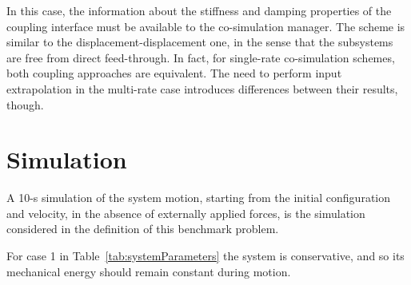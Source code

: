 \documentclass[fleqn,11pt]{article}
\begin{document}
In this case, the information about the stiffness and damping properties of the coupling interface must be available to the co-simulation manager.
The scheme is similar to the displacement-displacement one, in the sense that the subsystems are free from direct feed-through. 
In fact, for single-rate co-simulation schemes, both coupling approaches are equivalent.
The need to perform input extrapolation in the multi-rate case introduces differences between their results, though.


\section{Simulation}
\label{Simulation}

A 10-s simulation of the system motion, starting from the initial configuration and velocity, in the absence of externally applied forces, is the simulation considered in the definition of this benchmark problem.

For case 1 in Table~\ref{tab:systemParameters} the system is conservative, and so its mechanical energy should remain constant during motion.

\pagebreak
\pagestyle{bib}

\end{document}
